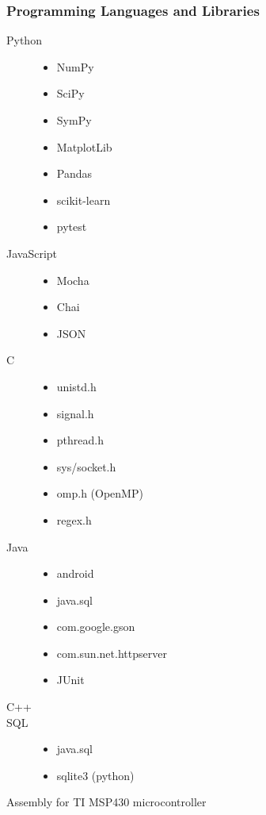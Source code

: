 \documentclass[11pt, letterpaper]{article}
\begin{document}
    \subsubsection*{Programming Languages and Libraries} 
      \begin{description}
        \item [Python]
          \begin{itemize}
            \item NumPy
            \item SciPy
            \item SymPy
            \item MatplotLib
            \item Pandas
            \item scikit-learn
            \item pytest
          \end{itemize}
        \item [JavaScript]
          \begin{itemize}
            \item Mocha
            \item Chai
            \item JSON
          \end{itemize}
        \item [C]
          \begin{itemize}
            \item unistd.h %
            \item signal.h %
            \item pthread.h %
            \item sys/socket.h
            \item omp.h (OpenMP)
            \item regex.h
          \end{itemize}
        \item [Java]
          \begin{itemize}
            \item android
            \item java.sql
            \item com.google.gson
            \item com.sun.net.httpserver
            \item JUnit
          \end{itemize}
        \item [C++]
        \item [SQL]
          \begin{itemize}
            \item java.sql
            \item sqlite3 (python)
          \end{itemize}
        \item [Assembly for TI MSP430 microcontroller]
      \end{description}
\end{document}
